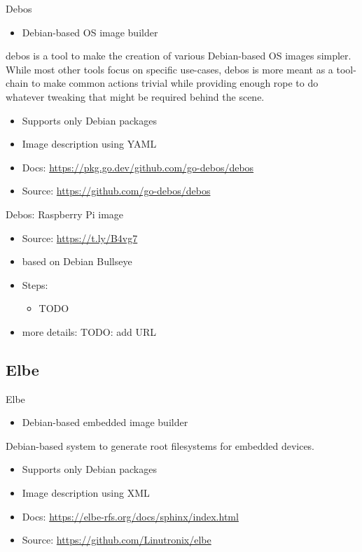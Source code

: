 \documentclass{beamer}
\begin{document}
\begin{frame}{Debos}
	\begin{itemize}
		\item Debian-based OS image builder
	\end{itemize}
	\begin{definition} 
		debos is a tool to make the creation of various Debian-based OS images simpler. While most other tools focus on specific use-cases, debos is more meant as a tool-chain to make common actions trivial while providing enough rope to do whatever tweaking that might be required behind the scene.
	\end{definition}
	\begin{itemize}
		\item Supports only Debian packages
		\item Image description using YAML
		\item Docs: \url{https://pkg.go.dev/github.com/go-debos/debos}
		\item Source: \url{https://github.com/go-debos/debos}
	\end{itemize}
\end{frame}

\begin{frame}{Debos: Raspberry Pi image}
	\begin{itemize}
		\item Source: \url{https://t.ly/B4vg7}
		\item based on Debian Bullseye
		\item Steps:
		\begin{itemize}
			\item TODO
		\end{itemize}
		\item more details: TODO: add URL
	\end{itemize}
\end{frame}

\subsection{Elbe}

\begin{frame}{Elbe}
	\begin{itemize}
		\item Debian-based embedded image builder
	\end{itemize}
	\begin{definition} 
		Debian-based system to generate root filesystems for embedded devices.
	\end{definition}
	\begin{itemize}
		\item Supports only Debian packages
		\item Image description using XML
		\item Docs: \url{https://elbe-rfs.org/docs/sphinx/index.html}
		\item Source: \url{https://github.com/Linutronix/elbe}
	\end{itemize}
\end{frame}
\end{document}
